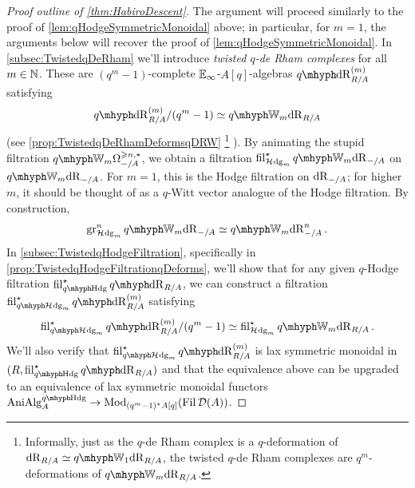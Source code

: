 \documentclass[DIV=12,numbers=enddot,leqno,bibliography=totoc]{scrartcl}
\begin{document}
	\begin{proof}[Proof outline of \cref{thm:HabiroDescent}]
		The argument will proceed similarly to the proof of \cref{lem:qHodgeSymmetricMonoidal} above; in particular, for $m=1$, the arguments below will recover the proof of \cref{lem:qHodgeSymmetricMonoidal}. In \cref{subsec:TwistedqDeRham} we'll introduce \emph{twisted $q$-de Rham complexes} for all $m\in\mathbb{N}$. These are $(q^m-1)$-complete $\mathbb{E}_\infty$-$A[q]$-algebras  $\qdeRham_{R/A}^{(m)}$ satisfying
		\begin{equation*}
			\qdeRham_{R/A}^{(m)}/(q^m-1)\simeq \qIW_m\deRham_{R/A}
		\end{equation*}
		(see \cref{prop:TwistedqDeRhamDeformsqDRW}%
		\footnote{Informally, just as the $q$-de Rham complex is a $q$-deformation of $\deRham_{R/A}\simeq \qIW_1\deRham_{R/A}$, the twisted $q$-de Rham complexes are $q^m$-deformations of $\qIW_m\deRham_{R/A}$.}%
		). By animating the stupid filtration $\qIW_m\Omega_{-/A}^{\geqslant n,*}$, we obtain a filtration $ \fil_{\Hhodge_m}^\star \qIW_m\deRham_{-/A}$ on $\qIW_m\deRham_{-/A}$. For $m=1$, this is the Hodge filtration on $\mathrm{dR}_{-/A}$; for higher $m$, it should be thought of as a $q$-Witt vector analogue of the Hodge filtration. By construction, 
		\begin{equation*}
			\gr_{\Hhodge_m}^n\qIW_m\deRham_{-/A}\simeq \qIW_m\deRham_{-/A}^n\,.
		\end{equation*}
		In \cref{subsec:TwistedqHodgeFiltration}, specifically in \cref{prop:TwistedqHodgeFiltrationqDeforms}, we'll show that for any given $q$-Hodge filtration $\fil_{\qHodge}^\star\qdeRham_{R/A}$, we can construct a filtration $ \fil_{\qHhodge_m}^\star \qdeRham_{R/A}^{(m)}$ satisfying
		\begin{equation*}
			\fil_{\qHhodge_m}^\star \qdeRham_{R/A}^{(m)}/(q^m-1)\simeq  \fil_{\Hhodge_m}^\star \qIW_m\deRham_{R/A}\,.
		\end{equation*}
		We'll also verify that $ \fil_{\qHhodge_m}^\star \qdeRham_{R/A}^{(m)}$ is lax symmetric monoidal in $(R, \fil_{\qHodge}^\star \qdeRham_{R/A})$ and that the equivalence above can be upgraded to an equivalence of lax symmetric monoidal functors $\cat{AniAlg}_A^{\qHodge}\rightarrow \Mod_{(q^m-1)^\star A[q]}( \Fil\Dd(A))$.
		

\end{proof}
\end{document}
